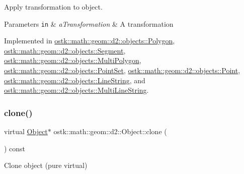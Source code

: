 Apply transformation to object. 


\begin{DoxyParams}[1]{Parameters}
\mbox{\tt in}  & {\em a\+Transformation} & A transformation \\
\hline
\end{DoxyParams}


Implemented in \hyperlink{classostk_1_1math_1_1geom_1_1d2_1_1objects_1_1_polygon_a00d04368f01daa0b234b403321453bbf}{ostk\+::math\+::geom\+::d2\+::objects\+::\+Polygon}, \hyperlink{classostk_1_1math_1_1geom_1_1d2_1_1objects_1_1_segment_afbd5fe1b8136f738a0e93b934b290394}{ostk\+::math\+::geom\+::d2\+::objects\+::\+Segment}, \hyperlink{classostk_1_1math_1_1geom_1_1d2_1_1objects_1_1_multi_polygon_a2dfac474c7787aac7ea0822e409bbff5}{ostk\+::math\+::geom\+::d2\+::objects\+::\+Multi\+Polygon}, \hyperlink{classostk_1_1math_1_1geom_1_1d2_1_1objects_1_1_point_set_a8c4140ca8434580a95df773d3aeed5bb}{ostk\+::math\+::geom\+::d2\+::objects\+::\+Point\+Set}, \hyperlink{classostk_1_1math_1_1geom_1_1d2_1_1objects_1_1_point_aa880df23e5ee93a60dad85597c600fb0}{ostk\+::math\+::geom\+::d2\+::objects\+::\+Point}, \hyperlink{classostk_1_1math_1_1geom_1_1d2_1_1objects_1_1_line_string_afd26337c26696a0ff1b4b2e94e58f17c}{ostk\+::math\+::geom\+::d2\+::objects\+::\+Line\+String}, and \hyperlink{classostk_1_1math_1_1geom_1_1d2_1_1objects_1_1_multi_line_string_ada5fe5a183b6628831867b416901459e}{ostk\+::math\+::geom\+::d2\+::objects\+::\+Multi\+Line\+String}.

\mbox{\label{classostk_1_1math_1_1geom_1_1d2_1_1_object_a98dedc6792aef35308966ca768eb3e14}} 
\subsubsection{\texorpdfstring{clone()}{clone()}}
{\footnotesize\ttfamily virtual \hyperlink{classostk_1_1math_1_1geom_1_1d2_1_1_object}{Object}$\ast$ ostk\+::math\+::geom\+::d2\+::\+Object\+::clone (\begin{DoxyParamCaption}{ }\end{DoxyParamCaption}) const\hspace{0.3cm}{\ttfamily [pure virtual]}}



Clone object (pure virtual) 

